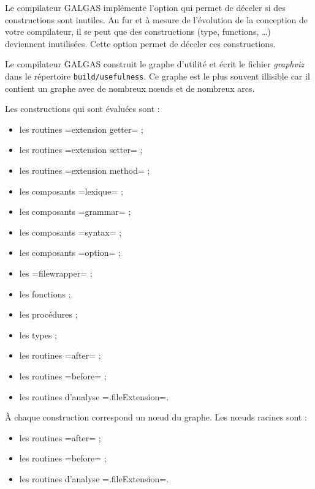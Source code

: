 

Le compilateur GALGAS implémente l'option  qui permet de déceler si des constructions sont inutiles. Au fur et à mesure de l'évolution de la conception de votre compilateur, il se peut que des constructions (type, functions, …) deviennent inutilisées. Cette option permet de déceler ces constructions.

Le compilateur GALGAS construit le graphe d'utilité et écrit le fichier \emph{graphviz} dans le répertoire \texttt{build/usefulness}. Ce graphe est le plus souvent illisible car il contient un graphe avec de nombreux nœuds et de nombreux arcs.



Les constructions qui sont évaluées sont :
\begin{itemize}
  \item les routines \ggs=extension getter= ;
  \item les routines \ggs=extension setter= ;
  \item les routines \ggs=extension method= ;
  \item les composants \ggs=lexique= ;
  \item les composants \ggs=grammar= ;
  \item les composants \ggs=syntax= ;
  \item les composants \ggs=option= ;
  \item les \ggs=filewrapper= ;
  \item les fonctions ;
  \item les procédures ;
  \item les types ;
  \item les routines \ggs=after= ;
  \item les routines \ggs=before= ;
  \item les routines d'analyse \ggs=.fileExtension=.
\end{itemize}

À chaque construction correspond un nœud du graphe. Les nœuds racines sont :
\begin{itemize}
  \item les routines \ggs=after= ;
  \item les routines \ggs=before= ;
  \item les routines d'analyse \ggs=.fileExtension=.
\end{itemize}


